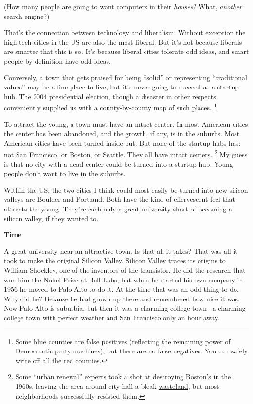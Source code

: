 \documentclass[12pt]{book}
\begin{document}
(How many people are going to want computers in their \emph{houses}?
What, \emph{another} search engine?)

That's the connection between technology and liberalism. Without
exception the high-tech cities in the US are also the most liberal. But
it's not because liberals are smarter that this is so. It's because
liberal cities tolerate odd ideas, and smart people by definition have
odd ideas.

Conversely, a town that gets praised for being ``solid'' or representing
``traditional values'' may be a fine place to live, but it's never going
to succeed as a startup hub. The 2004 presidential election, though a
disaster in other respects, conveniently supplied us with a
county-by-county
\href{http://www-personal.umich.edu/~mejn/election/2004/countymaplinearlarge.png}{map}
of such places. \footnote{Some blue counties are false positives (reflecting the remaining
power of Democractic party machines), but there are no false negatives.
You can safely write off all the red counties.}

To attract the young, a town must have an intact center. In most
American cities the center has been abandoned, and the growth, if any,
is in the suburbs. Most American cities have been turned inside out. But
none of the startup hubs has: not San Francisco, or Boston, or Seattle.
They all have intact centers. \footnote{Some ``urban renewal'' experts took a shot at destroying
Boston's in the 1960s, leaving the area around city hall a bleak
\href{http://www.pps.org/great_public_spaces/one?public_place_id=148}{wasteland},
but most neighborhoods successfully resisted them.} My guess is that
no city with a dead center could be turned into a startup hub. Young
people don't want to live in the suburbs.

Within the US, the two cities I think could most easily be turned into
new silicon valleys are Boulder and Portland. Both have the kind of
effervescent feel that attracts the young. They're each only a great
university short of becoming a silicon valley, if they wanted to.

\textbf{Time}

A great university near an attractive town. Is that all it takes? That
was all it took to make the original Silicon Valley. Silicon Valley
traces its origins to William Shockley, one of the inventors of the
transistor. He did the research that won him the Nobel Prize at Bell
Labs, but when he started his own company in 1956 he moved to Palo Alto
to do it. At the time that was an odd thing to do. Why did he? Because
he had grown up there and remembered how nice it was. Now Palo Alto is
suburbia, but then it was a charming college town-- a charming college
town with perfect weather and San Francisco only an hour away.
\end{document}
